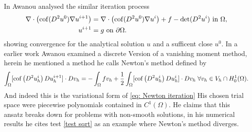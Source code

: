 In \cite{Awanou2014} Awanou analysed the similar iteration process
\begin{align}
	\nabla \cdot \left( \operatorname{cof}(D^2 u^0) \nabla u^{i+1} \right) &= \nabla \cdot \left( \operatorname{cof}(D^2 u^0) \nabla u^{i} \right) + f - \operatorname{det} (D^2u^i) \textnormal{ in } \Omega,  \label{eq: Awanout eq}\\
	u^{i+1} &= g \textnormal{ on } \partial \Omega.
\end{align}
showing convergence for the analytical solution $u$ and a sufficent close $u^0$. 
In a earlier work \cite{Awanou2010} Awanou examined a discrete Version of a vanishing moment method, herein he mentioned a method he calls Newton's method defined by
\[
	\int_{\Omega} [\operatorname{cof} \left(  D^2 u_h^i \right) Du_h^{i+1}] \cdot Dv_h = -	\int_{\Omega} f v_h + \frac 1 2 \int_{\Omega} [\operatorname{cof} \left(  D^2 u_h^i \right) Du_h^{i}] \cdot Dv_h \; \forall v_h \in V_h \cap H^1_0 (\Omega)  \label{eq: Awanout eq2}.
\]
And indeed this is the variational form of \eqref{eq: Newton iteration}
His chosen trial space were piecewise polynomials contained in $C^1(\Omega)$. He claims that this ansatz breaks down for problems with non-smooth solutions, in his numerical results he cites test \ref{test sqrt} as an example where Newton's method diverges.
